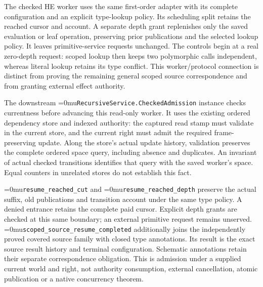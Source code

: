 \documentclass[11pt,a4paper]{article}
\newcommand{\name}[1]{\textup{\Urlmuskip=0mu\relax\nolinkurl{#1}}}
\begin{document}
The checked HE worker uses the same first-order adapter with its complete
configuration and an explicit type-lookup policy. Its scheduling split retains
the reached cursor and account. A separate depth grant replenishes only the
saved evaluation or leaf operation, preserving prior publications and the
selected lookup policy. It leaves primitive-service requests unchanged.
The controls begin at a real zero-depth request: scoped lookup then keeps two
polymorphic calls independent, whereas literal lookup retains its type conflict.
This worker/protocol connection is distinct from proving the remaining general
scoped source correspondence and from granting external effect authority.

The downstream \name{RecursiveService.CheckedAdmission} instance checks
currentness before advancing this read-only worker. It uses the existing
ordered dependency store and indexed authority: the captured read stamp must
validate in the current store, and the current right must admit the required
frame-preserving update. Along the store's actual update history, validation
preserves the complete ordered space query, including absence and duplicates.
An invariant of actual checked transitions identifies that query with the
saved worker's space. Equal counters in unrelated stores do not establish
this fact.

\name{resume\_reached\_cut} and \name{resume\_reached\_depth} preserve
the actual suffix, old publications and transition account under the same
type policy. A denied entrance retains the complete paid cursor. Explicit
depth grants are checked at this same boundary; an external primitive request
remains unserved. \name{scoped\_source\_resume\_completed} additionally
joins the independently proved covered source family with closed type
annotations. Its result is the exact source result history and terminal
configuration. Schematic annotations retain their separate correspondence
obligation. This is admission under a supplied current world and right,
not authority consumption, external cancellation, atomic publication or a
native concurrency theorem.
\end{document}

